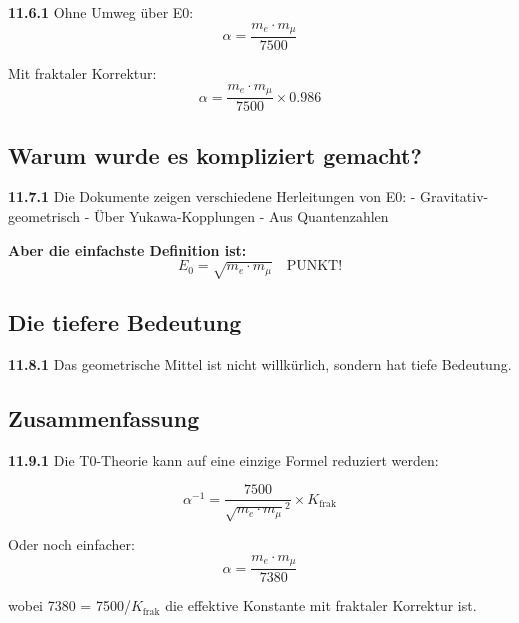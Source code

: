 \documentclass[12pt,a4paper]{article}
\newcommand{\kfrac}{K_{\text{frak}}}
\begin{document}
\begin{tcolorbox}[colback=green!5!white,colframe=green!75!black,title=\textbf{Die direkteste Formel}]
	\noindent \textbf{11.6.1} Ohne Umweg über E0:
	\begin{equation}
		\boxed{\alpha = \frac{m_e \cdot m_\mu}{7500}}
	\end{equation}
	
	Mit fraktaler Korrektur:
	\begin{equation}
		\boxed{\alpha = \frac{m_e \cdot m_\mu}{7500} \times 0.986}
	\end{equation}
\end{tcolorbox}

\subsection{Warum wurde es kompliziert gemacht?}

\noindent \textbf{11.7.1} Die Dokumente zeigen verschiedene Herleitungen von E0:
- Gravitativ-geometrisch
- Über Yukawa-Kopplungen
- Aus Quantenzahlen

\textbf{Aber die einfachste Definition ist:}
\begin{equation}
	\boxed{E_0 = \sqrt{m_e \cdot m_\mu} \quad \text{PUNKT!}}
\end{equation}

\subsection{Die tiefere Bedeutung}

\noindent \textbf{11.8.1} Das geometrische Mittel ist nicht willkürlich, sondern hat tiefe Bedeutung.

\subsection{Zusammenfassung}

\begin{tcolorbox}[colback=blue!5!white,colframe=blue!75!black,title=\textbf{Die Essenz}]
	\noindent \textbf{11.9.1} Die T0-Theorie kann auf eine einzige Formel reduziert werden:
	
	\begin{equation}
		\boxed{\alpha^{-1} = \frac{7500}{\sqrt{m_e \cdot m_\mu}^2} \times K_{\text{frak}}}
	\end{equation}
	
	Oder noch einfacher:
	\begin{equation}
		\boxed{\alpha = \frac{m_e \cdot m_\mu}{7380}}
	\end{equation}
	
	wobei 7380 = 7500/$\kfrac$ die effektive Konstante mit fraktaler Korrektur ist.
\end{tcolorbox}
\end{document}
